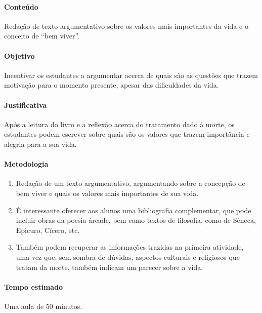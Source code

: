 \documentclass[12pt]{extarticle}
\begin{document}


\paragraph{Conteúdo} Redação de texto argumentativo sobre os valores 
mais importantes da vida e o conceito de ``bem viver''.

\paragraph{Objetivo} Incentivar os estudantes a argumentar acerca de
quais são as questões que trazem motivação para o momento presente,
apesar das dificuldades da vida.

\paragraph{Justificativa} Após a leitura do livro e a reflexão acerca do tratamento dado à morte,
os estudantes podem escrever sobre quais são os valores que trazem
importância e alegria para a sua vida.

\paragraph{Metodologia} 

\begin{enumerate}

\item Redação de um texto argumentativo, argumentando sobre a concepção
de bem viver e quais os valores mais importantes de sua vida.

\item É interessante oferecer
aos alunos uma bibliografia complementar, que pode incluir obras da
poesia árcade, bem como textos de filosofia, como de Sêneca, Epicuro,
Cícero, etc.

\item Também podem recuperar as informações trazidas na
primeira atividade, uma vez que, sem sombra de dúvidas, aspectos
culturais e religiosos que tratam da morte, também indicam um parecer
sobre a vida.

\end{enumerate}

\paragraph{Tempo estimado} Uma aula de 50 minutos.
\end{document}
